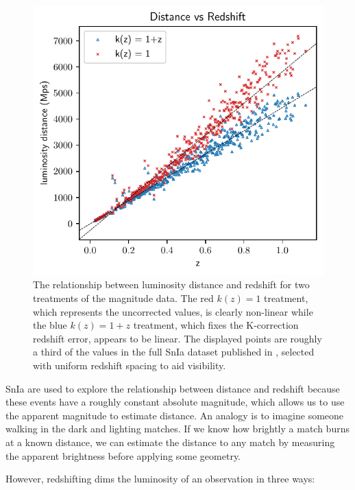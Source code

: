 \documentclass[aps,prl,reprint,amsmath]{revtex4-2}
\begin{document}
\begin{figure}
  \includegraphics[width=\columnwidth]{lum_distance_vs_redshift.pdf}
  \caption{The relationship between luminosity distance and redshift for two
  treatments of the magnitude data. The red $k(z) = 1$ treatment, which represents
  the uncorrected values, is clearly non-linear while the blue $k(z) = 1 + z$
  treatment, which fixes the K-correction redshift error, appears to be linear.
  The displayed points are roughly a third of the values in the full SnIa
  dataset published in \citet{abbott2024}, selected with uniform redshift
  spacing to aid visibility. }
  \label{fig:mu_distance_vs_redshift}
\end{figure}

SnIa are used to explore the relationship between distance and redshift because
these events have a roughly constant absolute magnitude, which allows us to use
the apparent magnitude to estimate distance. An analogy is to imagine someone
walking in the dark and lighting matches. If we know how brightly a match burns
at a known distance, we can estimate the distance to any match by measuring the
apparent brightness before applying some geometry.

However, redshifting dims the luminosity of an observation in three ways:
\end{document}
